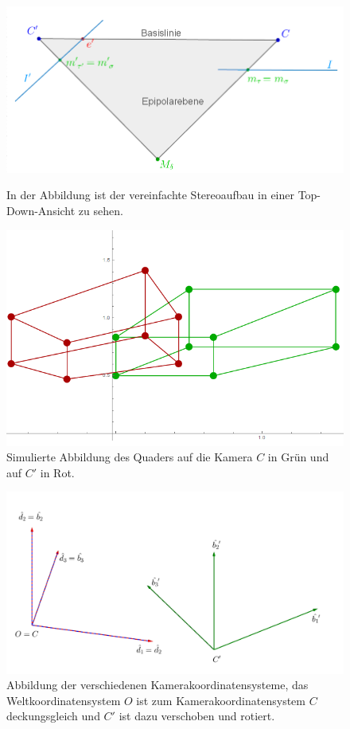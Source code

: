 \begin{figure}[!htb]
	\includegraphics[width=\linewidth]{images/SynthetischesBeispielAufbauTopDown_beschriftet.png}
	\caption[Synthetisches Beispiel: Top-Down-Ansicht]{In der Abbildung ist der vereinfachte Stereoaufbau in einer Top-Down-Ansicht zu sehen.}
	\label{fig:aufbauMinimalTopDown}
	\endminipage\hfill
	\includegraphics[width=\linewidth]{images/QuadrateMinimalBeispiel.png}
	\caption[Simulierte Abbildung eines Quaders auf zwei Kameras]{Simulierte Abbildung des Quaders auf die Kamera $C$ in Grün und auf $C'$ in Rot.}
	\label{fig:AbbildungenMinimal}
	\endminipage\hfill
\end{figure}

\begin{figure}[!htb]
	\centering
	\includegraphics[width=.6\linewidth]{images/KS_Minimalbeispiel_beschriftet.png}
	\caption[Koordinatensysteme von $C$ und $C'$]{Abbildung der verschiedenen Kamerakoordinatensysteme, das Weltkoordinatensystem  $O$ ist zum Kamerakoordinatensystem $C$ deckungsgleich und $C'$ ist dazu verschoben und rotiert.}
	\label{fig:KoordsystemeMinimal}
\end{figure}

